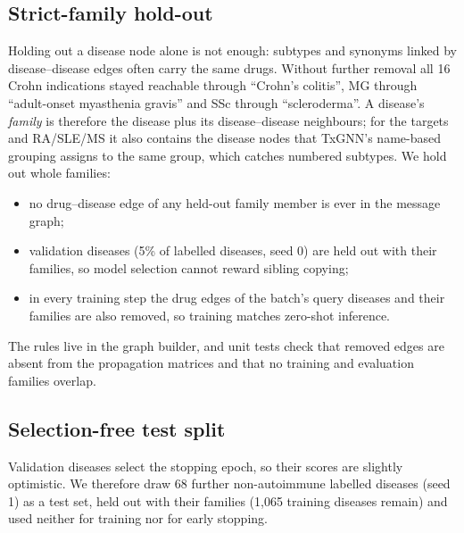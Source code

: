 \documentclass[journal]{IEEEtran}
\begin{document}
\subsection{Strict-family hold-out}
Holding out a disease node alone is not enough: subtypes and synonyms linked by disease--disease edges often carry the same drugs. Without further removal all 16 Crohn indications stayed reachable through ``Crohn's colitis'', MG through ``adult-onset myasthenia gravis'' and SSc through ``scleroderma''. A disease's \emph{family} is therefore the disease plus its disease--disease neighbours; for the targets and RA/SLE/MS it also contains the disease nodes that TxGNN's name-based grouping assigns to the same group, which catches numbered subtypes. We hold out whole families:
\begin{itemize}
\item no drug--disease edge of any held-out family member is ever in the message graph;
\item validation diseases (5\% of labelled diseases, seed 0) are held out with their families, so model selection cannot reward sibling copying;
\item in every training step the drug edges of the batch's query diseases and their families are also removed, so training matches zero-shot inference.
\end{itemize}
The rules live in the graph builder, and unit tests check that removed edges are absent from the propagation matrices and that no training and evaluation families overlap.

\subsection{Selection-free test split}
\label{sec:testsplit}
Validation diseases select the stopping epoch, so their scores are slightly optimistic. We therefore draw 68 further non-autoimmune labelled diseases (seed 1) as a test set, held out with their families (1,065 training diseases remain) and used neither for training nor for early stopping.
\end{document}
